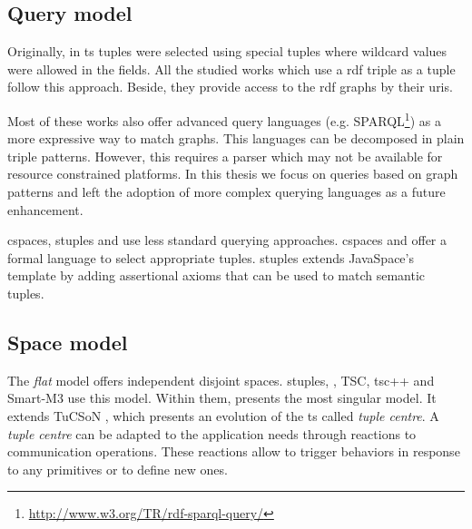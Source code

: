 


\subsection{Query model}

Originally, in \ac{ts} tuples were selected using special tuples where wildcard values were allowed in the fields. %
All the studied works which use a \ac{rdf} triple as a tuple follow this approach.
Beside, they provide access to the \ac{rdf} graphs by their \acp{uri}.

Most of these works also offer advanced query languages (e.g. SPARQL\footnote{\url{http://www.w3.org/TR/rdf-sparql-query/}}) as a more expressive way to match graphs.
This languages can be decomposed in plain triple patterns.
However, this requires a parser which may not be available for resource constrained platforms.
In this thesis we focus on queries based on graph patterns and left the adoption of more complex querying languages as a future enhancement.

\ac{cspaces}, \ac{stuples} and \citeauthor{nardini_semantic_2013} use less standard querying approaches.
\ac{cspaces} \citep{martinrecuerda_towards_2005} and \citet{nardini_semantic_2013} offer a formal language to select appropriate tuples.
\ac{stuples}\citep{khushraj_stuples:_2004} extends JavaSpace's template by adding assertional axioms that can be used to match semantic tuples.




\subsection{Space model}

The \emph{flat} model offers independent disjoint spaces.
\ac{stuples}, \citet{nardini_semantic_2013}, TSC, tsc++ and Smart-M3 use this model.
Within them, \citet{nardini_semantic_2013} presents the most singular model.
It extends TuCSoN \cite{omicini_tucson:_1998}, which presents an evolution of the \ac{ts} called \emph{tuple centre}.
A \emph{tuple centre} can be adapted to the application needs through reactions to communication operations.
These reactions allow to trigger behaviors in response to any primitives or to define new ones.


